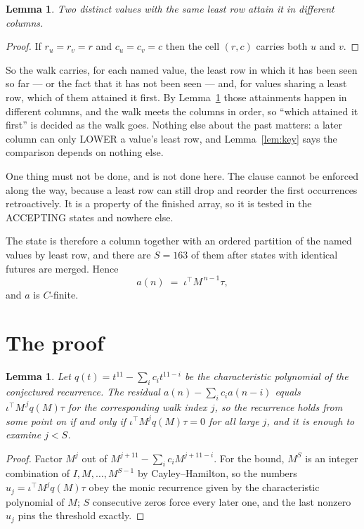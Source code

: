 \documentclass[11pt,a4paper]{article}
\theoremstyle{plain}
\newtheorem{lemma}[theorem]{Lemma}
\theoremstyle{definition}
\begin{document}
\begin{lemma}\label{lem:tie}
Two distinct values with the same least row attain it in different columns.
\end{lemma}

\begin{proof}
If $r_u=r_v=r$ and $c_u=c_v=c$ then the cell $(r,c)$ carries both $u$ and $v$.
\end{proof}

So the walk carries, for each named value, the least row in which it has been seen so far ---
or the fact that it has not been seen --- and, for values sharing a least row, which of them
attained it first. By Lemma~\ref{lem:tie} those attainments happen in different columns, and
the walk meets the columns in order, so ``which attained it first'' is decided as the walk
goes. Nothing else about the past matters: a later column can only LOWER a value's least row,
and Lemma~\ref{lem:key} says the comparison depends on nothing else.

One thing must not be done, and is not done here. The clause cannot be enforced along the way,
because a least row can still drop and reorder the first occurrences retroactively. It is a
property of the finished array, so it is tested in the ACCEPTING states and nowhere else.

The state is therefore a column together with an ordered partition of the named values by least
row, and there are $S=163$ of them after states with identical futures are merged. Hence
\[
a(n)\;=\;\iota^{\!\top}M^{\,n-1}\tau,
\]
and $a$ is $C$-finite.

\section{The proof}

\begin{lemma}\label{lem:crit}
Let $q(t)=t^{11}-\sum_i c_it^{11-i}$ be the characteristic polynomial of the
conjectured recurrence. The residual $a(n)-\sum_ic_ia(n-i)$ equals
$\iota^{\!\top}M^{\,j}q(M)\tau$ for the corresponding walk index $j$, so the recurrence
holds from some point on if and only if $\iota^{\!\top}M^{j}q(M)\tau=0$ for all large $j$,
and it is enough to examine $j<S$.
\end{lemma}

\begin{proof}
Factor $M^{j}$ out of $M^{j+11}-\sum_ic_iM^{j+11-i}$. For the bound, $M^{S}$
is an integer combination of $I,M,\dots,M^{S-1}$ by Cayley--Hamilton, so the numbers
$u_j=\iota^{\!\top}M^{j}q(M)\tau$ obey the monic recurrence given by the characteristic
polynomial of $M$; $S$ consecutive zeros force every later one, and the last nonzero $u_j$
pins the threshold exactly.
\end{proof}
\end{document}
